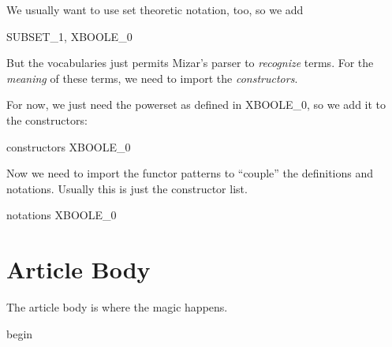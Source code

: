 \documentclass[oneside]{book}%
\begin{document}
\M
We usually want to use set theoretic notation, too, so we add

\nwenddocs{}\plusendmoddef\nwstartdeflinemarkup{}\nwenddeflinemarkup
  SUBSET_1, XBOOLE_0
\nwendcode{}\nwdocspar

But the vocabularies just permits Mizar's parser to \emph{recognize}
terms. For the \emph{meaning} of these terms, we need to import the
\emph{constructors}.

For now, we just need the powerset as defined in {\Tt{}XBOOLE{\_}0\nwendquote}, so we add
it to the constructors:

\nwenddocs{}\endmoddef\nwstartdeflinemarkup{}\nwenddeflinemarkup
constructors XBOOLE_0
\nwendcode{}\nwdocspar

Now we need to import the functor patterns to ``couple'' the definitions
and notations. Usually this is just the constructor list.

\nwenddocs{}\endmoddef\nwstartdeflinemarkup{}\nwenddeflinemarkup
notations XBOOLE_0
\nwendcode{}\nwdocspar

\section{Article Body}

\M
The article body is where the magic happens.

\nwenddocs{}\endmoddef\nwstartdeflinemarkup{}\nwenddeflinemarkup
begin
\nwendcode{}
\end{document}
